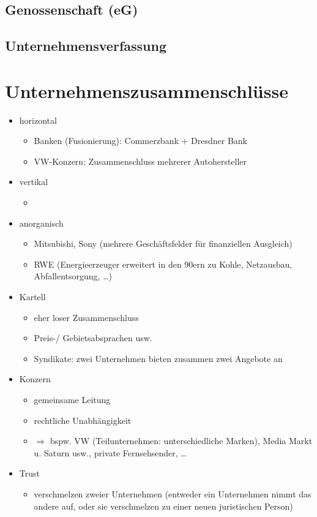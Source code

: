 \subsection{Genossenschaft (eG)}

\subsection{Unternehmensverfassung}

\section{Unternehmenszusammenschlüsse}
\begin{itemize}
\item horizontal
\begin{itemize}
\item Banken (Fusionierung): Commerzbank + Dresdner Bank
\item VW-Konzern: Zusammenschluss mehrerer Autohersteller
\end{itemize}
\item vertikal
\begin{itemize}
\item 
\end{itemize}
\item anorganisch
\begin{itemize}
\item Mitsubishi, Sony (mehrere Geschäftsfelder für finanziellen Ausgleich)
\item RWE (Energieerzeuger erweitert in den 90ern zu Kohle, Netzausbau, Abfallentsorgung, …)
\end{itemize}
\end{itemize}

\begin{itemize}
\item Kartell
\begin{itemize}
\item eher loser Zusammenschluss
\item Preis-/ Gebietsabsprachen usw.
\item Syndikate: zwei Unternehmen bieten zusammen zwei Angebote an
\end{itemize}
\item Konzern
\begin{itemize}
\item gemeinsame Leitung
\item rechtliche Unabhängigkeit
\item $\Rightarrow$ bspw. VW (Teilunternehmen: unterschiedliche Marken), Media Markt u. Saturn usw.,  private Fernsehsender, …
\end{itemize}
\item Trust
\begin{itemize}
\item verschmelzen zweier Unternehmen (entweder ein Unternehmen nimmt das andere auf, oder sie verschmelzen zu einer neuen juristischen Person)
\end{itemize}
\end{itemize}
